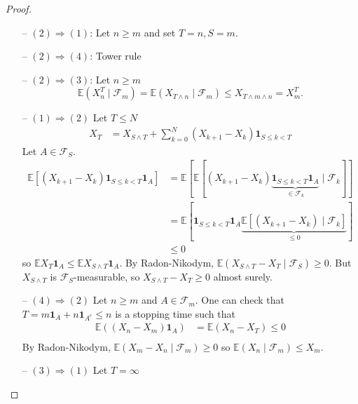 \documentclass[parskip=full]{article}
\theoremstyle{definition}
\newcommand{\1}{\mathbbm{1}}
\newcommand{\E}{\mathbb{E}}
\begin{document}
\begin{proof}
  \begin{itemize}
    \item[--] $(2) \Rightarrow (1)$: Let $n \geq m$ and set $T = n, S = m$.
    \item[--] $(2) \Rightarrow (4)$: Tower rule
    \item[--] $(2) \Rightarrow (3)$: Let $n \geq m$
          \[
            \E(X_n^T \mid \mathcal{F}_m) = \E (X_{T \wedge n} \mid \mathcal{F}_m) \leq X_{T \wedge m \wedge n} = X_m^T.
          \]
    \item[--] $(1) \Rightarrow (2)$ Let $T \leq N$
          \begin{align*}
            X_T & =X_{S \wedge T} + \sum_{k = 0}^N (X_{k + 1} - X_k) \mathbf{1}_{S \leq k < T} \tag{$*$}
          \end{align*}
          Let $A \in \mathcal{F}_S$.
          \begin{align*}
            \E \left[(X_{k + 1} - X_k)\mathbf{1}_{S \leq k < T} \mathbf{1}_A \right] & = \E \left[\E \left[(X_{k + 1} - X_k)\underbrace{\mathbf{1}_{S \leq k < T}\mathbf{1}_A}_{\in \mathcal{F}_k} \mid \mathcal{F}_k \right]\right] \\
                                                                                     & = \E \left[ \mathbf{1}_{S \leq k < T} \mathbf{1}_A \underbrace{\E \left[(X_{k + 1} - X_k) \mid \mathcal{F}_k \right]}_{\leq 0}\right]         \\
                                                                                     & \leq 0
          \end{align*}
          so $\E X_T \mathbf{1}_A \leq \E X_{S \wedge T} \mathbf{1}_A$. By Radon-Nikodym, $\E(X_{S \wedge T} - X_T \mid \mathcal{F}_S) \geq 0$. But $X_{S \wedge T}$ is $\mathcal{F}_S$-measurable, so $X_{S \wedge T} - X_T \geq 0$ almost surely.

    \item[--] $(4) \Rightarrow (2)$ Let $n \geq m$ and $A \in \mathcal{F}_m$. One can check that $T = m \mathbf{1}_A + n \mathbf{1}_{A^c} \leq n$ is a stopping time such that
          \begin{align*}
            \E((X_n - X_m) \mathbf{1}_A) & = \E(X_n - X_T) \leq 0 \\
          \end{align*}
          By Radon-Nikodym, $\E(X_m - X_n \mid \mathcal{F}_m) \geq 0$ so $\E(X_n \mid \mathcal{F}_m) \leq X_m$.

    \item [--] $(3) \Rightarrow (1)$ Let $T = \infty$
  \end{itemize}
\end{proof}
\end{document}
